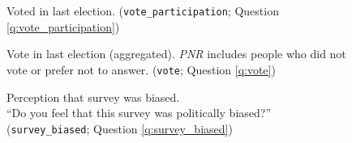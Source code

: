 \begin{figure}[h!] 
    \cprotect\caption[Voted in last election]{Voted in last election. (\verb|vote_participation|; Question \ref{q:vote_participation})}\label{fig:vote_participation}
\end{figure}

\begin{figure}[h!] 
    \cprotect\caption[Vote in last election]{Vote in last election (aggregated). \textit{PNR} includes people who did not vote or prefer not to answer. (\verb|vote|; Question \ref{q:vote})}\label{fig:vote}
\end{figure}

\begin{figure}[h!] 
    \cprotect\caption[Perception that survey was biased]{Perception that survey was biased. \\ ``Do you feel that this survey was politically biased?'' (\verb|survey_biased|; Question \ref{q:survey_biased})}\label{fig:survey_biased}
\end{figure}

